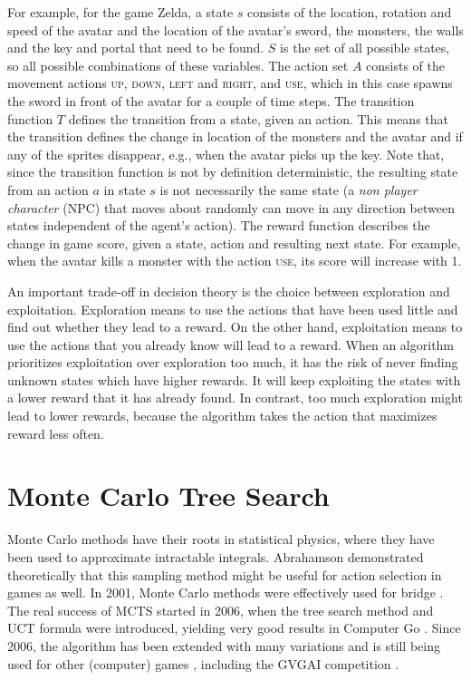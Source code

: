 For example, for the game Zelda, a state $s$ consists of the location, rotation
and speed of the avatar and the location of the avatar's sword, the monsters, the
walls and the key and portal that need to be found. $S$ is the set of all
possible states, so all possible combinations of these variables. The action set
$A$ consists of the movement actions \textsc{up}, \textsc{down}, \textsc{left}
and \textsc{right}, and \textsc{use}, which in this case spawns the sword in
front of the avatar for a couple of time steps. The transition function $T$
defines the transition from a state, given an action.  This means that the
transition defines the change in location of the monsters and the avatar and if
any of the sprites disappear, e.g., when the avatar picks up the key. Note that,
since the transition function is not by definition deterministic, the resulting
state from an action $a$ in state $s$ is not necessarily the same state
(a \emph{non player character} (NPC) that moves about randomly can move in any direction between
states independent of the agent's action). The reward function describes the
change in game score, given a state, action and resulting next state. For
example, when the avatar kills a monster with the action \textsc{use}, its score
will increase with 1.

An important trade-off in decision theory is the choice between exploration and
exploitation. Exploration means to use the actions that have been used little
and find out whether they lead to a reward. On the other hand, exploitation
means to use the actions that you already know will lead to a reward. When an
algorithm prioritizes exploitation over exploration too much, it has the risk of
never finding unknown states which have higher rewards. It will keep exploiting
the states with a lower reward that it has already found. In contrast, too much
exploration might lead to lower rewards, because the algorithm takes the action
that maximizes reward less often.

\section{Monte Carlo Tree Search}
\label{subsec:mcts}
Monte Carlo methods have their roots in statistical physics, where they have
been used to approximate intractable integrals. Abrahamson
\cite{abramson1990expected} demonstrated theoretically that this sampling method
might be useful for action selection in games as well.  In 2001, Monte Carlo
methods were effectively used for bridge \cite{ginsberg2001gib}. The real
success of MCTS started in 2006, when the tree search method and UCT formula
were introduced, yielding very good results in Computer Go
\cite{gelly2006modification}. Since 2006, the algorithm has been extended with
many variations and is still being used for other (computer) games
\cite{browne2012survey}, including the GVGAI competition
\cite{perez2014knowledge}.

